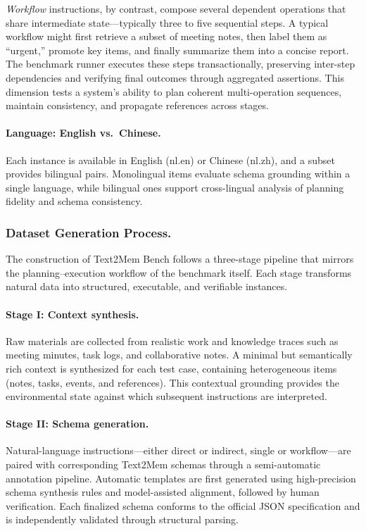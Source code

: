 \documentclass[conference]{IEEEtran}
\begin{document}
\emph{Workflow} instructions, by contrast, compose several dependent operations that share intermediate state—typically three to five sequential steps.  
A typical workflow might first retrieve a subset of meeting notes, then label them as “urgent,” promote key items, and finally summarize them into a concise report.  
The benchmark runner executes these steps transactionally, preserving inter-step dependencies and verifying final outcomes through aggregated assertions.  
This dimension tests a system’s ability to plan coherent multi-operation sequences, maintain consistency, and propagate references across stages.

\paragraph{Language: English vs.\ Chinese.}
Each instance is available in English (nl.en) or Chinese (nl.zh), and a subset provides bilingual pairs.  
Monolingual items evaluate schema grounding within a single language, while bilingual ones support cross-lingual analysis of planning fidelity and schema consistency.

\subsubsection{\textbf{Dataset Generation Process.}}
The construction of Text2Mem Bench follows a three-stage pipeline that mirrors the planning–execution workflow of the benchmark itself.  
Each stage transforms natural data into structured, executable, and verifiable instances.

\paragraph{Stage I: Context synthesis.}
Raw materials are collected from realistic work and knowledge traces such as meeting minutes, task logs, and collaborative notes.  
A minimal but semantically rich context is synthesized for each test case, containing heterogeneous items (notes, tasks, events, and references).  
This contextual grounding provides the environmental state against which subsequent instructions are interpreted.

\paragraph{Stage II: Schema generation.}
Natural-language instructions—either direct or indirect, single or workflow—are paired with corresponding Text2Mem schemas through a semi-automatic annotation pipeline.  
Automatic templates are first generated using high-precision schema synthesis rules and model-assisted alignment, followed by human verification.  
Each finalized schema conforms to the official JSON specification and is independently validated through structural parsing.
\end{document}
